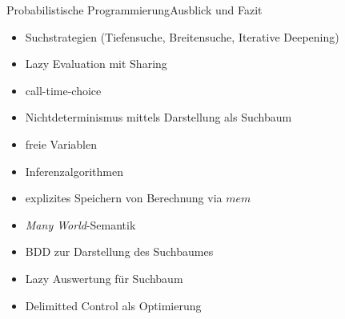 \documentclass{beamer}
\begin{document}
\begin{frame}{Probabilistische Programmierung}{Ausblick und Fazit}
\begin{minipage}{.48\textwidth}
\begin{itemize}
\item Suchstrategien (Tiefensuche, Breitensuche, Iterative Deepening)
\item Lazy Evaluation mit Sharing
\item call-time-choice
\item Nichtdeterminismus mittels Darstellung als Suchbaum
\item freie Variablen
\end{itemize}
\end{minipage}
%
\hfill
%
\begin{minipage}{.48\textwidth}
\begin{itemize}
\item Inferenzalgorithmen
\item explizites Speichern von Berechnung via $mem$
\item \emph{Many World}-Semantik
\item BDD zur Darstellung des Suchbaumes
\item Lazy Auswertung f\"ur Suchbaum
\item Delimitted Control als Optimierung
\end{itemize}
\end{minipage}

\end{frame}
\end{document}
